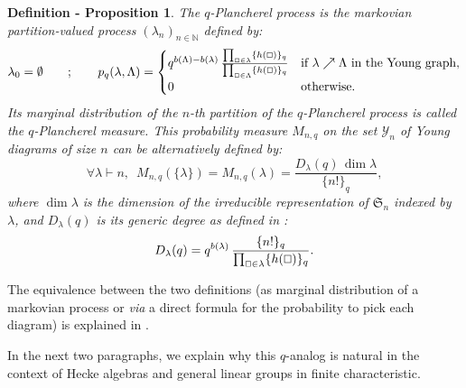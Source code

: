 \documentclass[10pt]{amsart}
\newtheorem{definitionproposition}{Definition - Proposition}
\theoremstyle{remark}
\newcommand{\N}{\mathbb{N}}
\newcommand{\sym}{\mathfrak{S}}
\newcommand{\young}{\mathscr{Y}}
\begin{document}
\begin{definitionproposition}\label{def_measure}
The $q$-Plancherel process is the markovian partition-valued process
$(\lambda_{n})_{n \in \N}$ defined by:
$$\lambda_{0}=\emptyset\qquad;\qquad p_{q}(\lambda,\Lambda)=\begin{cases} q^{b(\Lambda)-b(\lambda)}\,\frac{\prod_{\oblong \in \lambda} \{h(\oblong)\}_{q}}{\prod_{\oblong \in \Lambda} \{h(\oblong)\}_{q}}& \text{if }\lambda \nearrow \Lambda \text{ in the Young graph},\\
0&\text{otherwise}.\end{cases}$$ 
Its marginal distribution of the $n$-th partition of the $q$-Plancherel process is called the $q$-Plancherel measure.
This probability measure $M_{n,q}$ on the set $\young_n$ of Young diagrams of size $n$ can be alternatively defined by:
$$\forall \lambda \vdash n,\,\,\, M_{n,q}(\{\lambda\})=  M_{n,q}(\lambda)=\frac{D_\lambda(q)\,\dim \lambda}{\{n!\}_q},$$
where $\dim \lambda$ is the dimension of the irreducible representation of $\sym_n$ indexed by $\lambda$, and $D_\lambda(q)$ is its generic degree as defined in \cite[Chapter 8]{GP00}:
$$D_{\lambda}(q)=q^{b(\lambda)}\,\frac{\{n!\}_{q}}{\prod_{\oblong \in \lambda}\{h(\oblong)\}_{q}}.$$
\end{definitionproposition}
\noindent The equivalence between the two definitions (as marginal distribution of a markovian process or {\it via} a direct formula for the probability to pick each diagram) is explained in \cite[Section 3]{Stra08}.

In the next two paragraphs, we explain why this $q$-analog is natural in the context of Hecke algebras and general linear groups in finite characteristic.\bigskip
\end{document}
